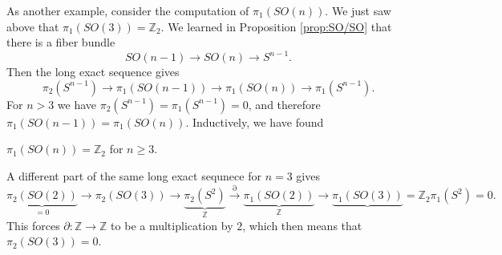 \documentclass[12pt]{article}
\numberwithin{equation}{section}
\numberwithin{figure}{section}
\theoremstyle{remark}
\def\bZ{\mathbb{Z}}
\begin{document}
As another example, consider the computation of $\pi_1(SO(n))$.
We just saw above that $\pi_1(SO(3))=\bZ_2$.
We learned in Proposition \ref{prop:SO/SO} that there is a fiber bundle
\begin{equation}
SO(n-1)\to SO(n)\to S^{n-1}.
\end{equation} Then the long exact sequence gives
\begin{equation}
  \pi_2(S^{n-1})\to \pi_1(SO(n-1))\to \pi_1(SO(n))\to \pi_1(S^{n-1}).
\end{equation}
For $n>  3$ we have $\pi_{2}(S^{n-1})=\pi_1(S^{n-1})=0$, and therefore $\pi_1(SO(n-1))=\pi_1(SO(n))$.
Inductively, we have found 
\begin{example}
  \label{ex:pi1SOn}
$\pi_1(SO(n))=\bZ_2$ for $n\ge 3$.
\end{example}


A different part of the same long exact sequnece for $n=3$ gives \begin{equation}
  \underbrace{\pi_2(SO(2))}_{=0}
  \to \pi_2(SO(3)) 
  \to \underbrace{\pi_2(S^2)}_{\bZ}
  \stackrel{\partial}{\longrightarrow}  \underbrace{\pi_1(SO(2))}_{\bZ} \to \underbrace{\pi_1(SO(3))}=\bZ_2  \pi_1(S^2)=0.
\end{equation}
This forces $\partial:\bZ\to \bZ$ to be a multiplication by $2$,
which then means that $\pi_2(SO(3))=0$.
\end{document}

